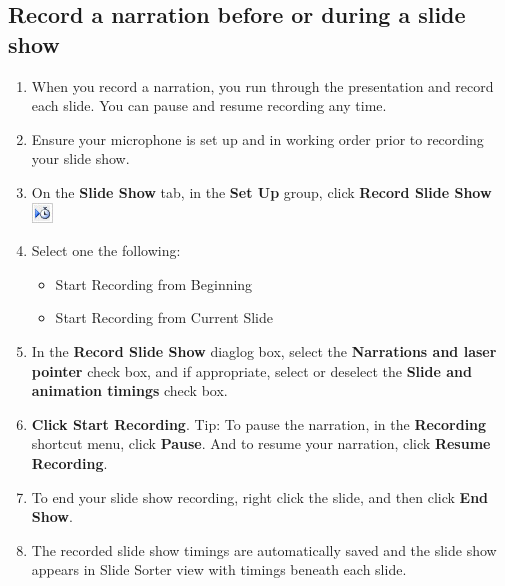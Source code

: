 \documentclass[10pt,a4paper]{article}
\begin{document}
\subsection{Record a narration before or during a slide show}
\begin{enumerate}
\item When you record a narration, you run through the presentation and record each slide. You can pause and resume recording any time.
\item Ensure your microphone is set up and in working order prior to recording your slide show.
\item On the \textbf{Slide Show} tab, in the \textbf{Set Up} group, click \textbf{Record Slide Show} \includegraphics{ppt_record_slide_show}
\item Select one the following:
\begin{itemize}
\item Start Recording from Beginning
\item Start Recording from Current Slide
\end{itemize}
\item In the \textbf{Record  Slide Show} diaglog box, select the \textbf{Narrations and laser pointer} check box, and if appropriate, select or deselect the \textbf{Slide and animation timings} check box.
\item \textbf{Click Start Recording}.
Tip: To pause the narration, in the \textbf{Recording} shortcut menu, click \textbf{Pause}. And to resume your narration, click \textbf{Resume Recording}.
\item To end your slide show recording, right click the slide, and then click \textbf{End Show}.
\item The recorded slide show timings are automatically saved and the slide show appears in Slide Sorter view with timings beneath each slide.
\end{enumerate}
\end{document}
